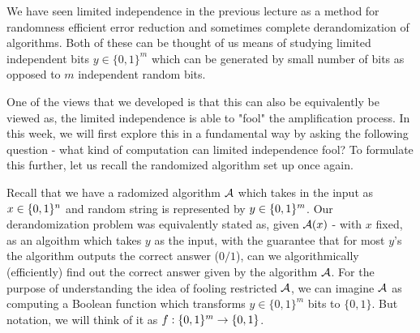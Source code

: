 
We have seen limited independence in the previous lecture as a method for randomness efficient error reduction and sometimes complete derandomization of algorithms. Both of these can be thought of us means of studying limited independent bits $y \in \{0,1\}^m$ which can be generated by small number of bits as opposed to $m$ independent random bits. 

One of the views that we developed is that this can also be equivalently be viewed as, the limited independence is able to "fool" the amplification process. In this week, we will first explore this in a fundamental way by asking the following question - what kind of computation can limited independence fool? To formulate this further, let us recall the randomized algorithm set up once again. \\

\begin{minipage}{0.5\linewidth}
Recall that we have a radomized algorithm ${\cal A}$ which takes in the input as $x \in \{0,1\}^n$ and random string is represented by $y \in \{0,1\}^m$.
Our derandomization problem was equivalently stated as, given ${\cal A}(x)$ - with $x$ fixed, as an algoithm which takes $y$ as the input, with the guarantee that for most $y$'s the algorithm outputs the correct answer ($0/1$), can we algorithmically (efficiently) find out the correct answer given by the algorithm ${\cal A}$. For the purpose of understanding the idea of fooling restricted ${\cal A}$, we can imagine ${\cal A}$ as computing a Boolean function which transforms $y \in \{0,1\}^m$ bits to $\{0,1\}$. But notation, we will think of it as $f : \{0,1\}^m \to \{0,1\}$.
\end{minipage}
\begin{minipage}{0.05\linewidth}
~
\end{minipage}
\begin{minipage}{0.4\linewidth}
\end{minipage}

